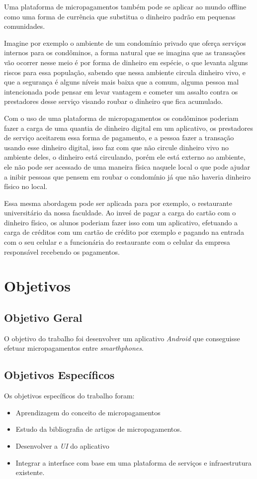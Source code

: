 \documentclass[hidelinks,12pt]{article}
\begin{document}
Uma plataforma de micropagamentos tamb\'em pode se aplicar ao mundo offline como uma forma de currência que substitua o dinheiro padr\~ao em pequenas comunidades.

Imagine por exemplo o ambiente de um condom\'inio privado que ofer\c{c}a servi\c{c}os internos para os condôminos, a forma natural que se imagina que as transa\c{c}\~oes v\~ao ocorrer nesse meio \'e por forma de dinheiro em esp\'ecie, o que levanta alguns riscos para essa popula\c{c}\~ao, sabendo que nessa ambiente circula dinheiro vivo, e que a seguran\c{c}a \'e alguns n\'iveis mais baixa que a comum, alguma pessoa mal intencionada pode pensar em levar vantagem e cometer um assalto contra os prestadores desse servi\c{c}o visando roubar o dinheiro que fica acumulado.

Com o uso de uma plataforma de micropagamentos os condôminos poderiam fazer a carga de uma quantia de dinheiro digital em um aplicativo, os prestadores de servi\c{c}o aceitarem essa forma de pagamento, e a pessoa fazer a transa\c{c}\~ao usando esse dinheiro digital, isso faz com que n\~ao circule dinheiro vivo no ambiente deles, o dinheiro est\'a circulando, por\'em ele est\'a externo ao ambiente, ele n\~ao pode ser acessado de uma maneira f\'isica naquele local o que pode ajudar a inibir pessoas que pensem em roubar o condom\'inio j\'a que n\~ao haveria dinheiro f\'isico no local.

Essa mesma abordagem pode ser aplicada para por exemplo, o restaurante universit\'ario da nossa faculdade. Ao inveś de pagar a carga do cart\~ao com o dinheiro f\'isico, os alunos poderiam fazer isso com um aplicativo, efetuando a carga de cr\'editos com um cart\~ao de cr\'edito por exemplo e pagando na entrada com o seu celular e a funcion\'aria do restaurante com o celular da empresa respons\'avel recebendo os pagamentos.
\newpage
\section{Objetivos}


\subsection{Objetivo Geral}
O objetivo do trabalho foi desenvolver um aplicativo \textit{Android} que conseguisse efetuar micropagamentos entre \textit{smarthphones}.
\newline


\subsection{Objetivos Espec\'ificos}
Os objetivos espec\'ificos do trabalho foram:
\begin{itemize}
	\item Aprendizagem do conceito de micropagamentos
	\item Estudo da bibliografia de artigos de micropagamentos.
	\item Desenvolver a \textit{UI} do aplicativo 
	\item Integrar a interface com base em uma plataforma de servi\c{c}os e infraestrutura existente.
\end{itemize}
\newpage
\end{document}
